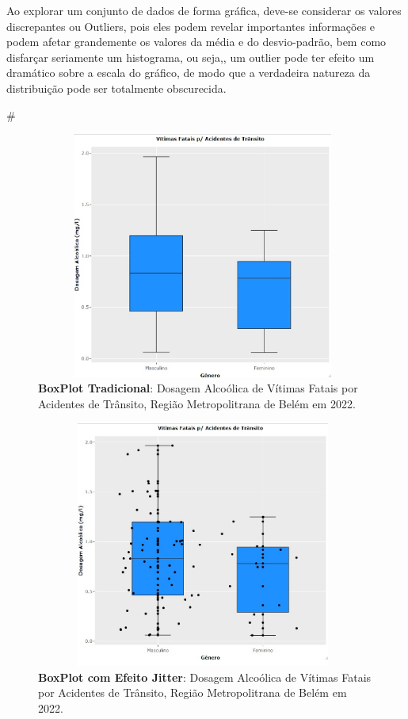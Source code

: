 \inic Ao explorar um conjunto de dados de forma gráfica, deve-se considerar os valores discrepantes ou Outliers, pois eles podem revelar importantes informações e podem afetar grandemente os valores da média e do desvio-padrão, bem como disfarçar seriamente um histograma, ou seja,, um outlier pode ter efeito um dramático sobre a escala do gráfico, de modo que a verdadeira natureza da distribuição pode ser totalmente  obscurecida.




#\vspace{-6cm}
\begin{figure}[H]
    \centering
\includegraphics[scale=0.25,height=230pt,width=11cm]{figures/boxplot_dosagem.jpeg}
    \caption{\textbf{BoxPlot Tradicional}: Dosagem Alcoólica de Vítimas Fatais por Acidentes de Trânsito, Região Metropolitrana de Belém em 2022.}
    \label{fig:my_label25}
\end{figure}



\vspace{-2cm}
\begin{figure}[H]
    \centering
\includegraphics[scale=0.25,height=230pt,width=11cm]{figures/boxplot_dosagem_jitter.jpeg}
    \caption{\textbf{BoxPlot com Efeito Jitter}: Dosagem Alcoólica de Vítimas Fatais por Acidentes de Trânsito, Região Metropolitrana de Belém em 2022.}
    \label{fig:my_label25}
\end{figure}







